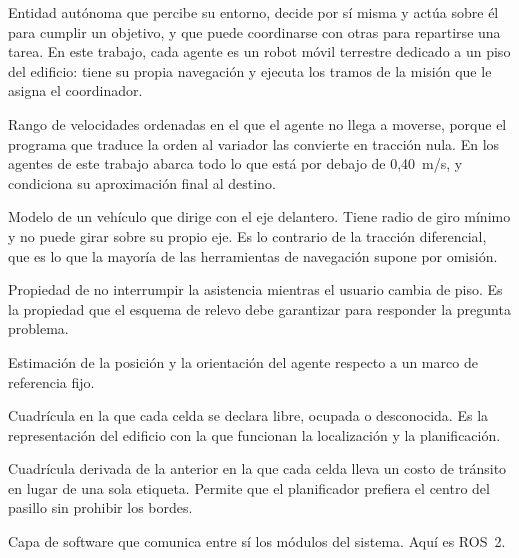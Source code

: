 \begin{description}[style=nextline,leftmargin=1.5em,itemsep=0.2em]
  \item[Agente] Entidad autónoma que percibe su entorno, decide por sí misma y actúa sobre él para cumplir un objetivo, y que puede coordinarse con otras para repartirse una tarea. En este trabajo, cada agente es un robot móvil terrestre dedicado a un piso del edificio: tiene su propia navegación y ejecuta los tramos de la misión que le asigna el coordinador.

  \item[Banda muerta de tracción] Rango de velocidades ordenadas en el que el agente no llega a moverse, porque el programa que traduce la orden al variador las convierte en tracción nula. En los agentes de este trabajo abarca todo lo que está por debajo de 0,40~m/s, y condiciona su aproximación final al destino.

  \item[Cinemática tipo automóvil (dirección Ackermann)] Modelo de un vehículo
    que dirige con el eje delantero. Tiene radio de giro mínimo y no puede girar
    sobre su propio eje. Es lo contrario de la tracción diferencial, que es lo
    que la mayoría de las herramientas de navegación supone por omisión.

  \item[Continuidad del servicio] Propiedad de no interrumpir la asistencia
    mientras el usuario cambia de piso. Es la propiedad que el esquema de relevo
    debe garantizar para responder la pregunta problema.

  \item[Localización] Estimación de la posición y la orientación del agente respecto a un marco de referencia fijo.

  \item[Mapa de ocupación] Cuadrícula en la que cada celda se declara libre,
    ocupada o desconocida. Es la representación del edificio con la que
    funcionan la localización y la planificación.

  \item[Mapa de costos (\textit{costmap})] Cuadrícula derivada de la anterior en
    la que cada celda lleva un costo de tránsito en lugar de una sola etiqueta.
    Permite que el planificador prefiera el centro del pasillo sin prohibir
    los bordes.

  \item[Middleware robótico] Capa de software que comunica entre sí los módulos
    del sistema. Aquí es ROS~2.


\end{description}
